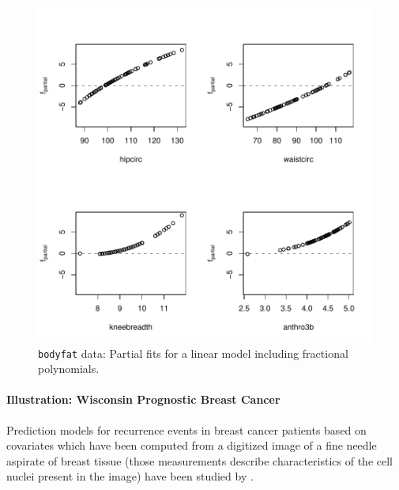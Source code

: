 \documentclass{article}
\newcommand{\Robject}[1]{\texttt{#1}}
\begin{document}
\begin{figure}
\begin{center}
\includegraphics{figures/BH-bodyfat-fpboost-plot}
\caption{\Robject{bodyfat} data: Partial fits for a linear model including 
fractional polynomials. \label{bodyfat-fpboost-plot}}
\end{center}
\end{figure}



\paragraph{Illustration: Wisconsin Prognostic Breast Cancer}


Prediction models for recurrence events in breast cancer patients 
based on covariates which have been computed from a digitized image of a
fine needle aspirate of breast tissue (those measurements describe
characteristics of the cell nuclei present in the image) have been studied
by \citet{street1995} \citep[the data is part of the UCI repository][]{uci1998}.
\end{document}
